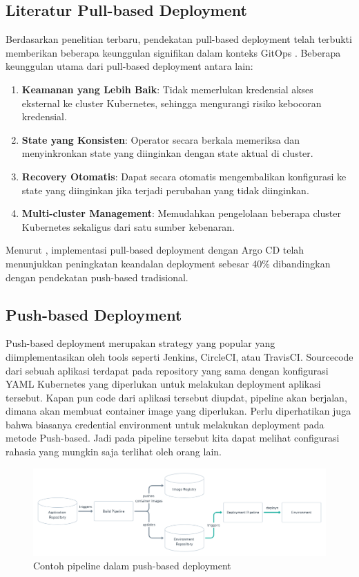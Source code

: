\subsection{Literatur Pull-based Deployment}
Berdasarkan penelitian terbaru, pendekatan pull-based deployment telah terbukti memberikan beberapa keunggulan signifikan dalam konteks GitOps \cite{Korhonen2021}. Beberapa keunggulan utama dari pull-based deployment antara lain:
\begin{enumerate}
    \item \textbf{Keamanan yang Lebih Baik}: Tidak memerlukan kredensial akses eksternal ke cluster Kubernetes, sehingga mengurangi risiko kebocoran kredensial.
    \item \textbf{State yang Konsisten}: Operator secara berkala memeriksa dan menyinkronkan state yang diinginkan dengan state aktual di cluster.
    \item \textbf{Recovery Otomatis}: Dapat secara otomatis mengembalikan konfigurasi ke state yang diinginkan jika terjadi perubahan yang tidak diinginkan.
    \item \textbf{Multi-cluster Management}: Memudahkan pengelolaan beberapa cluster Kubernetes sekaligus dari satu sumber kebenaran.
\end{enumerate}

Menurut \cite{Sharma2022}, implementasi pull-based deployment dengan Argo CD telah menunjukkan peningkatan keandalan deployment sebesar 40\% dibandingkan dengan pendekatan push-based tradisional.
\vspace{0.5cm}
\subsection{Push-based Deployment}
Push-based deployment \cite{GitOps} merupakan strategy yang popular yang diimplementasikan oleh
tools seperti Jenkins, CircleCI, atau TravisCI.
Sourcecode dari sebuah aplikasi terdapat pada repository yang sama dengan konfigurasi YAML Kubernetes yang diperlukan untuk melakukan deployment aplikasi tersebut.
Kapan pun code dari aplikasi tersebut diupdat, pipeline akan berjalan, dimana akan membuat container image yang diperlukan.
Perlu diperhatikan juga bahwa biasanya credential environment untuk melakukan deployment pada metode Push-based. Jadi pada pipeline tersebut kita dapat melihat
configurasi rahasia yang mungkin saja terlihat oleh orang lain.
\begin{figure}[ht]
    \centering
    \includegraphics[width=1\textwidth]{figures/push-based.png}
    \caption{Contoh pipeline dalam push-based deployment}
\end{figure}
\newpage
\vspace{0.5cm}
